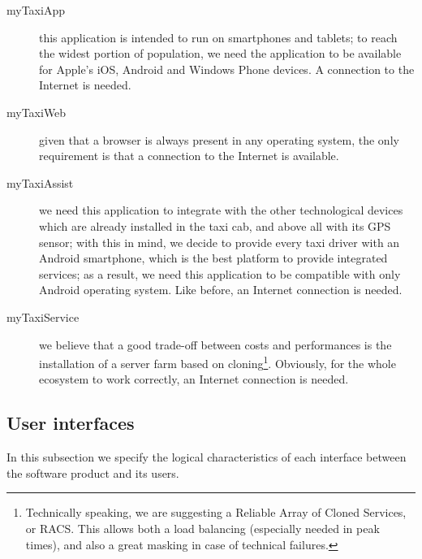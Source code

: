 \begin{description}
	
	\item [myTaxiApp] this application is intended to run on smartphones and tablets; to reach the widest portion of population, we need the application to be available for Apple's iOS, Android and Windows Phone devices. A connection to the Internet is needed.
	
	\item [myTaxiWeb] given that a browser is always present in any operating system, the only requirement is that a connection to the Internet is available.
	
	\item [myTaxiAssist] we need this application to integrate with the other technological devices which are already installed in the taxi cab, and above all with its GPS sensor; with this in mind, we decide to provide every taxi driver with an Android smartphone, which is the best platform to provide integrated services; as a result, we need this application to be compatible with only Android operating system. Like before, an Internet connection is needed.
	
	\item [myTaxiService] we believe that a good trade-off between costs and performances is the installation of a server farm based on cloning\footnote{Technically speaking, we are suggesting a Reliable Array of Cloned Services, or RACS. This allows both a load balancing (especially needed in peak times), and also a great masking in case of technical failures.}. Obviously, for the whole ecosystem to work correctly, an Internet connection is needed.

\end{description}


\subsection{User interfaces}
In this subsection we specify the logical characteristics of each interface between the software product and its users.

